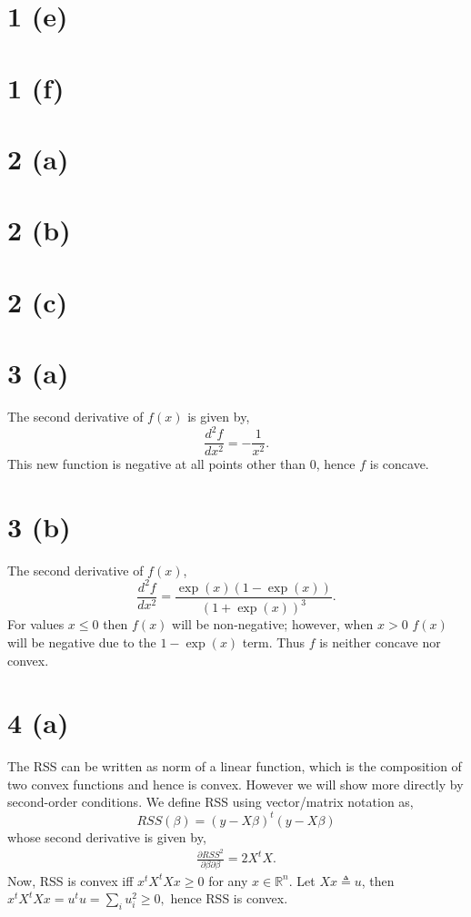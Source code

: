 \documentclass[10pt]{article}
\begin{document}
\section*{1 (e)}
\section*{1 (f)}

\section*{2 (a)}
\section*{2 (b)}
\section*{2 (c)}

\section*{3 (a)}
The second derivative of $f(x)$ is given by, \[\frac{d^2 f}{d x^2} = -\frac{1}{x^2}.\] This new function
is negative at all points other than 0, hence $f$ is concave.
\section*{3 (b)}
The second derivative of $f(x)$, \[\frac{d^2 f}{d x^2} = \frac{\exp(x)(1 - \exp(x))}{(1 +
\exp(x))^3}.\] For values $x \leq 0$ then $f(x)$ will be non-negative; however, when $x > 0$
$f(x)$ will be negative due to the $1 - \exp(x)$ term. Thus $f$ is neither concave nor convex.

\section*{4 (a)}
The RSS can be written as norm of a linear function, which is the composition of two convex
functions and hence is convex. However we will show more directly by second-order conditions.
We define RSS using vector/matrix notation as, \[RSS(\beta) = (y - X\beta)^t(y - X\beta)\] whose
second derivative is given by,
\begin{align*}
    \frac{\partial RSS^2}{\partial \beta \partial \beta} = 2X^t X.
\end{align*}
Now, RSS is convex iff $x^tX^tXx \geq 0$ for any $x \in \mathbb{R}^n$. Let $Xx \triangleq u$, then
$x^tX^tXx = u^t u = \sum_i u_i^2 \geq 0,$ hence RSS is convex.
\end{document}
